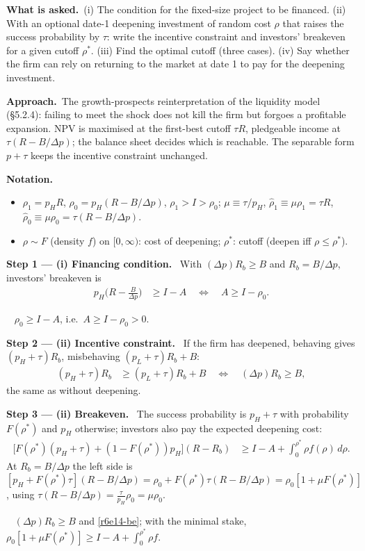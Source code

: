\documentclass[11pt,a4paper]{article}
\newcommand{\notation}{\par\noindent\textbf{Notation.}}
\newcommand{\step}[2]{\par\medskip\noindent\textbf{Step #1 --- #2.}~}
\newcommand{\asked}{\par\medskip\noindent\textbf{What is asked.}~}
\newcommand{\approach}{\par\smallskip\noindent\textbf{Approach.}~}
\newcommand{\answer}[1]{\par\smallskip\noindent\fbox{\textbf{Answer #1.}}~}
\begin{document}
\asked (i) The condition for the fixed-size project to be financed. (ii) With an optional date-1 deepening investment of random cost $\rho$ that raises the success probability by $\tau$: write the incentive constraint and investors' breakeven for a given cutoff $\rho^*$. (iii) Find the optimal cutoff (three cases). (iv) Say whether the firm can rely on returning to the market at date 1 to pay for the deepening investment.

\approach The growth-prospects reinterpretation of the liquidity model (\S 5.2.4): failing to meet the shock does not kill the firm but forgoes a profitable expansion. NPV is maximised at the first-best cutoff $\tau R$, pledgeable income at $\tau(R-B/\Delta p)$; the balance sheet decides which is reachable. The separable form $p+\tau$ keeps the incentive constraint unchanged.

\notation
\begin{itemize}
  \item $\rho_1=p_HR$, $\rho_0=p_H(R-B/\Delta p)$, $\rho_1>I>\rho_0$; $\mu\equiv\tau/p_H$, $\hat\rho_1\equiv\mu\rho_1=\tau R$, $\hat\rho_0\equiv\mu\rho_0=\tau(R-B/\Delta p)$.
  \item $\rho\sim F$ (density $f$) on $[0,\infty)$: cost of deepening; $\rho^*$: cutoff (deepen iff $\rho\le\rho^*$).
\end{itemize}

\step{1}{(i) Financing condition} With $(\Delta p)R_b\ge B$ and $R_b=B/\Delta p$, investors' breakeven is
\begin{align}
  p_H\Big(R-\frac{B}{\Delta p}\Big) &\ge I-A \quad\Longleftrightarrow\quad A\ge I-\rho_0. \label{r6e14-i}
\end{align}
\answer{(i)} $\rho_0\ge I-A$, i.e.\ $A\ge I-\rho_0>0$.

\step{2}{(ii) Incentive constraint} If the firm has deepened, behaving gives $(p_H+\tau)R_b$, misbehaving $(p_L+\tau)R_b+B$:
\begin{align}
  (p_H+\tau)R_b &\ge (p_L+\tau)R_b+B \quad\Longleftrightarrow\quad (\Delta p)R_b\ge B, \label{r6e14-ic}
\end{align}
the same as without deepening.

\step{3}{(ii) Breakeven} The success probability is $p_H+\tau$ with probability $F(\rho^*)$ and $p_H$ otherwise; investors also pay the expected deepening cost:
\begin{align}
  \big[F(\rho^*)(p_H+\tau)+(1-F(\rho^*))p_H\big](R-R_b) &\ge I-A+\int_0^{\rho^*}\rho f(\rho)\,d\rho. \label{r6e14-be}
\end{align}
At $R_b=B/\Delta p$ the left side is $[p_H+F(\rho^*)\tau](R-B/\Delta p)=\rho_0+F(\rho^*)\tau(R-B/\Delta p)=\rho_0[1+\mu F(\rho^*)]$, using $\tau(R-B/\Delta p)=\frac{\tau}{p_H}\rho_0=\mu\rho_0$.
\answer{(ii)} $(\Delta p)R_b\ge B$ and \eqref{r6e14-be}; with the minimal stake, $\rho_0[1+\mu F(\rho^*)]\ge I-A+\int_0^{\rho^*}\rho f$.
\end{document}
